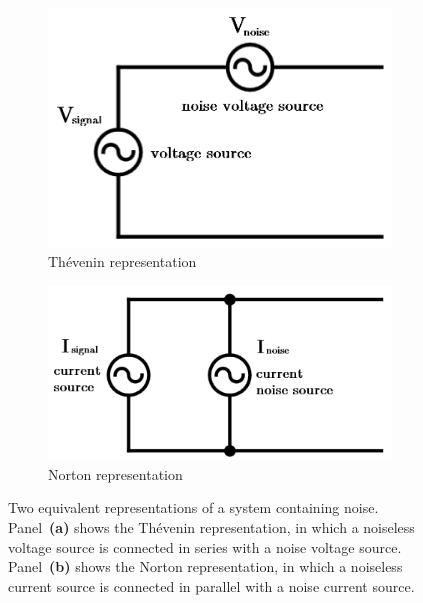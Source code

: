 \documentclass[12pt]{report}
\newcommand{\figureinset}[3]{\llap{\parbox[b]{#2in}{#1\\\rule{0ex}{#3in}}}}
\begin{document}
\begin{figure}[h]
    \centering
    \begin{subfigure}[b]{.43\textwidth}
        \includegraphics[width=\textwidth]{Figures/thevenin.png}%
        \caption{Th\'evenin representation}
        \label{fig:thevenin}
    \end{subfigure}
    \begin{subfigure}[b]{.49\textwidth}
        \includegraphics[width=\textwidth]{Figures/norton.png}%
        \caption{Norton representation}
        \label{fig:norton}
    \end{subfigure}
    \caption{Two equivalent representations of a system containing noise. Panel~\textbf{(a)} shows the Th\'evenin representation, in which a noiseless voltage source is connected in series with a noise voltage source. Panel~\textbf{(b)} shows the Norton representation, in which a noiseless current source is connected in parallel with a noise current source.}
\end{figure}
\end{document}
